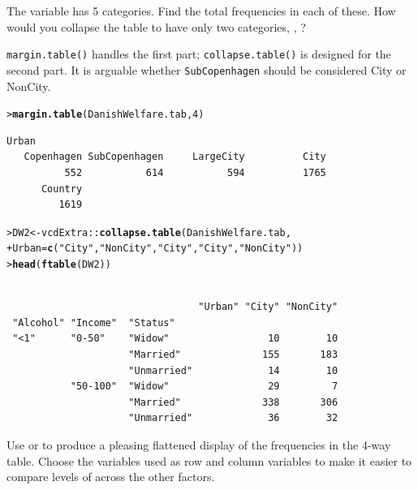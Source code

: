 \documentclass[10pt]{report}\usepackage[]{graphicx}\usepackage[]{color}
\makeatletter
\newcommand{\hlnum}[1]{\textcolor[rgb]{0.686,0.059,0.569}{#1}}%
\newcommand{\hlstr}[1]{\textcolor[rgb]{0.192,0.494,0.8}{#1}}%
\newcommand{\hlopt}[1]{\textcolor[rgb]{0,0,0}{#1}}%
\newcommand{\hlstd}[1]{\textcolor[rgb]{0.345,0.345,0.345}{#1}}%
\newcommand{\hlkwb}[1]{\textcolor[rgb]{0.69,0.353,0.396}{#1}}%
\newcommand{\hlkwc}[1]{\textcolor[rgb]{0.333,0.667,0.333}{#1}}%
\newcommand{\hlkwd}[1]{\textcolor[rgb]{0.737,0.353,0.396}{\textbf{#1}}}%
\newenvironment{kframe}{%
 \def\at@end@of@kframe{}%
 \ifinner\ifhmode%
  \def\at@end@of@kframe{\end{minipage}}%
  \begin{minipage}{\columnwidth}%
 \fi\fi%
 \def\FrameCommand##1{\hskip\@totalleftmargin \hskip-\fboxsep
 \colorbox{shadecolor}{##1}\hskip-\fboxsep
     \hskip-\linewidth \hskip-\@totalleftmargin \hskip\columnwidth}%
 \MakeFramed {\advance\hsize-\width
   \@totalleftmargin\z@ \linewidth\hsize
   \@setminipage}}%
 {\par\unskip\endMakeFramed%
 \at@end@of@kframe}
\newenvironment{knitrout}{}{} %
\renewenvironment{knitrout}{\small\renewcommand{\baselinestretch}{.85}}{} %
\makeatother
\begin{document}
\begin{Exercises}
\begin{enumerate*}
    \item The variable  has 5 categories.  Find the total frequencies
    in each of these.  How would you collapse the table to have only
    two categories, , ?
    \begin{ans}
      \texttt{margin.table()} handles the first part; \texttt{collapse.table()} is designed for the second part. 
      It is arguable whether
      \texttt{SubCopenhagen} should be considered City or NonCity.
\begin{knitrout}\footnotesize
{}\color{fgcolor}\begin{kframe}
\begin{alltt}
\hlstd{> }\hlkwd{margin.table}\hlstd{(DanishWelfare.tab,} \hlnum{4}\hlstd{)}
\end{alltt}
\begin{verbatim}
Urban
   Copenhagen SubCopenhagen     LargeCity          City 
          552           614           594          1765 
      Country 
         1619 
\end{verbatim}
\begin{alltt}
\hlstd{> }\hlstd{DW2} \hlkwb{<-} \hlstd{vcdExtra}\hlopt{::}\hlkwd{collapse.table}\hlstd{(DanishWelfare.tab,}
\hlstd{+ }                                \hlkwc{Urban}\hlstd{=}\hlkwd{c}\hlstd{(}\hlstr{"City"}\hlstd{,}\hlstr{"NonCity"}\hlstd{,}\hlstr{"City"}\hlstd{,}\hlstr{"City"}\hlstd{,}\hlstr{"NonCity"}\hlstd{))}
\hlstd{> }\hlkwd{head}\hlstd{(}\hlkwd{ftable}\hlstd{(DW2))}
\end{alltt}
\begin{verbatim}
                                                         
                                 "Urban" "City" "NonCity"
 "Alcohol" "Income"  "Status"                            
 "<1"      "0-50"    "Widow"                 10        10
                     "Married"              155       183
                     "Unmarried"             14        10
           "50-100"  "Widow"                 29         7
                     "Married"              338       306
                     "Unmarried"             36        32
\end{verbatim}
\end{kframe}
\end{knitrout}
    \end{ans}
    
    \item Use  or  to produce a pleasing
    flattened display of the frequencies in the 4-way table.  Choose the
    variables used as row and column variables to make it easier to compare
    levels of  across the other factors.
    \begin{ans}
    \end{ans}
    

\end{enumerate*}
\end{Exercises}
\end{document}
